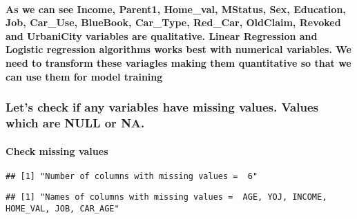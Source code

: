\documentclass[]{article}
\let\oldparagraph\paragraph
\renewcommand{\paragraph}[1]{\oldparagraph{#1}\mbox{}}
\begin{document}
\hypertarget{as-we-can-see-income-parent1-home_val-mstatus-sex-education-job-car_use-bluebook-car_type-red_car-oldclaim-revoked-and-urbanicity-variables-are-qualitative.-linear-regression-and-logistic-regression-algorithms-works-best-with-numerical-variables.-we-need-to-transform-these-variagles-making-them-quantitative-so-that-we-can-use-them-for-model-training}{%
\paragraph{As we can see Income, Parent1, Home\_val, MStatus, Sex,
Education, Job, Car\_Use, BlueBook, Car\_Type, Red\_Car, OldClaim,
Revoked and UrbaniCity variables are qualitative. Linear Regression and
Logistic regression algorithms works best with numerical variables. We
need to transform these variagles making them quantitative so that we
can use them for model
training}\label{as-we-can-see-income-parent1-home_val-mstatus-sex-education-job-car_use-bluebook-car_type-red_car-oldclaim-revoked-and-urbanicity-variables-are-qualitative.-linear-regression-and-logistic-regression-algorithms-works-best-with-numerical-variables.-we-need-to-transform-these-variagles-making-them-quantitative-so-that-we-can-use-them-for-model-training}}

\hypertarget{lets-check-if-any-variables-have-missing-values.-values-which-are-null-or-na.}{%
\subsubsection{\texorpdfstring{\textbf{Let's check if any variables have
missing values. Values which are NULL or
NA.}}{Let's check if any variables have missing values. Values which are NULL or NA.}}\label{lets-check-if-any-variables-have-missing-values.-values-which-are-null-or-na.}}

\hypertarget{check-missing-values}{%
\paragraph{\texorpdfstring{\textbf{Check missing
values}}{Check missing values}}\label{check-missing-values}}

\begin{verbatim}
## [1] "Number of columns with missing values =  6"
\end{verbatim}

\begin{verbatim}
## [1] "Names of columns with missing values =  AGE, YOJ, INCOME, HOME_VAL, JOB, CAR_AGE"
\end{verbatim}
\end{document}
